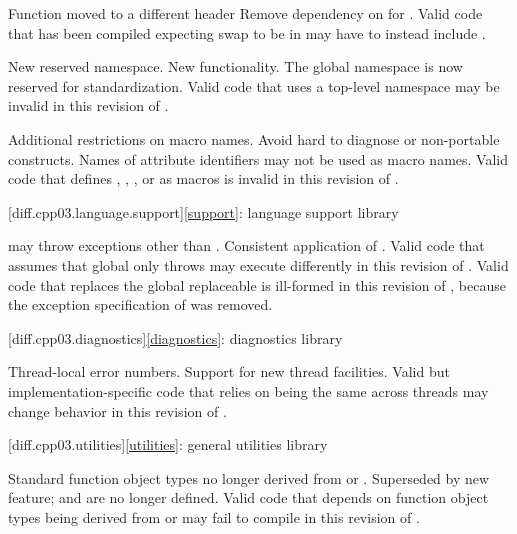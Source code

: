\effect
Function  moved to a different header
\rationale
Remove dependency on  for .
\effect
Valid \CppIII{} code that has been compiled expecting swap to be in
 may have to instead include .

\change
New reserved namespace.
\rationale
New functionality.
\effect
The global namespace  is now reserved for standardization. Valid
\CppIII{} code that uses a top-level namespace  may be invalid in
this revision of \Cpp{}.

\change
Additional restrictions on macro names.
\rationale
Avoid hard to diagnose or non-portable constructs.
\effect
Names of attribute identifiers may not be used as macro names. Valid \CppIII{}
code that defines , ,
, or  as macros is invalid in this
revision of \Cpp{}.

[diff.cpp03.language.support]{\ref{support}:
language support library}

\change
{} may throw exceptions other than
.
\rationale
Consistent application of .
\effect
Valid \CppIII{} code that assumes that global  only
throws  may execute differently in this revision of \Cpp{}.
Valid \CppIII{} code that replaces the global replaceable 
is ill-formed in this revision of \Cpp{},
because the exception specification of 
was removed.

[diff.cpp03.diagnostics]{\ref{diagnostics}: diagnostics library}

\change
Thread-local error numbers.
\rationale
Support for new thread facilities.
\effect
Valid but implementation-specific \CppIII{} code that relies on
 being the same across threads may change behavior in this
revision of \Cpp{}.

[diff.cpp03.utilities]{\ref{utilities}: general utilities library}

\change
Standard function object types no longer derived from
 or .
\rationale
Superseded by new feature;  and
 are no longer defined.
\effect
Valid \CppIII{} code that depends on function object types being derived from
 or  may fail to compile
in this revision of \Cpp{}.

